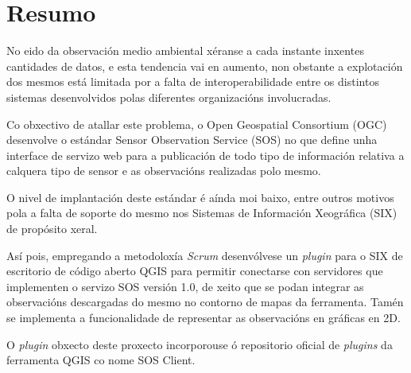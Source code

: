 \pagestyle{plain}
\chapter*{Resumo}
No eido da observación medio ambiental xéranse a cada instante inxentes cantidades de datos, e esta tendencia vai en aumento, non obstante a explotación dos mesmos está limitada por a falta de interoperabilidade entre os distintos sistemas desenvolvidos polas diferentes organizacións involucradas.

Co obxectivo de atallar este problema, o Open Geospatial Consortium (OGC) desenvolve o estándar Sensor Observation Service (SOS) no que define unha interface de servizo web para a publicación de todo tipo de información relativa a calquera tipo de sensor e as observacións realizadas polo mesmo.

O nivel de implantación deste estándar é aínda moi baixo, entre outros motivos pola a falta de soporte do mesmo nos Sistemas de Información Xeográfica (SIX) de propósito xeral.

Así pois, empregando a metodoloxía \emph{Scrum} desenvólvese un \emph{plugin} para o SIX de escritorio de código aberto QGIS para permitir conectarse con servidores que implementen o servizo SOS versión 1.0, de xeito que se podan integrar as observacións descargadas do mesmo no contorno de mapas da ferramenta. Tamén se implementa a funcionalidade de representar as observacións en gráficas en 2D.

O \emph{plugin} obxecto deste proxecto incorporouse ó repositorio oficial de \emph{plugins} da ferramenta QGIS co nome SOS Client.